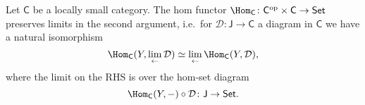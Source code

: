 \documentclass[main.tex]{subfiles}
\begin{document}
\begin{theorem}
  \label{thm:homfunctorpreserveslimits}
  Let $\mathsf{C}$ be a locally small category. The hom functor $\Hom_{\mathsf{C}}\colon \mathsf{C}^{\mathrm{op}} \times \mathsf{C} \rightarrow \mathsf{Set}$ preserves limits in the second argument, i.e.~for $\mathcal{D}\colon \mathsf{J} \rightarrow \mathsf{C}$ a diagram in $\mathsf{C}$ we have a natural isomorphism
  \begin{equation*}
    \Hom_{\mathsf{C}}(Y, \lim_{\leftarrow}\mathcal{D}) \simeq \lim_{\leftarrow}\Hom_{\mathsf{C}}(Y, \mathcal{D}),
  \end{equation*}
  where the limit on the RHS is over the hom-set diagram
  \begin{equation*}
    \Hom_{\mathsf{C}}(Y, -) \circ \mathcal{D} \colon \mathsf{J} \rightarrow \mathsf{Set}.
  \end{equation*}
\end{theorem}
\end{document}
